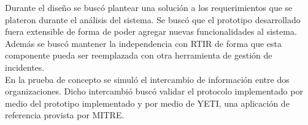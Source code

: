 Durante el diseño se buscó plantear una solución a los requerimientos que se plateron durante el análisis del sistema. Se buscó que el prototipo desarrollado fuera extensible de forma de poder agregar nuevas funcionalidades al sistema. Además se buscó mantener la independencia con RTIR de forma que esta componente pueda ser reemplazada con otra herramienta de gestión de incidentes. \\

En la prueba de concepto se simuló el intercambio de información entre dos organizaciones. Dicho intercambió buscó validar el protocolo implementado por medio del prototipo implementado y por medio de YETI, una aplicación de referencia provista por MITRE.

